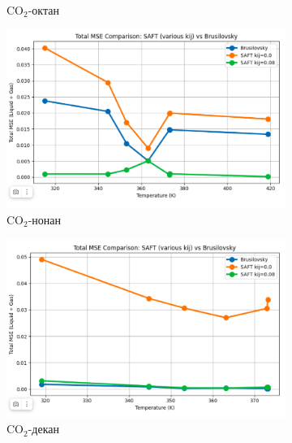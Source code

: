 \documentclass[a4paper,12pt]{article}
\begin{document}
\begin{itemize}
\begin{itemize}
\begin{figure}[ht]
\begin{subfigure}{0.30\textwidth}
        \caption{$\mathrm{CO}_2$-октан}
        \label{fig:rmse_octane}
    \end{subfigure}

    \vspace{0.5cm}

    \begin{subfigure}{0.30\textwidth}
        \centering
        \includegraphics[width=\textwidth]{images/mole_nonane.png}
        \caption{$\mathrm{CO}_2$-нонан}
        \label{fig:rmse_nonane}
    \end{subfigure}
    \hfill
    \begin{subfigure}{0.30\textwidth}
        \centering
        \includegraphics[width=\textwidth]{images/mole_decane.png}
        \caption{$\mathrm{CO}_2$-декан}
        \label{fig:rmse_decane}
    \end{subfigure}
    \hfill
    \begin{subfigure}{0.30\textwidth}
        \centering

\end{subfigure}
\end{figure}
\end{itemize}
\end{itemize}
\end{document}

